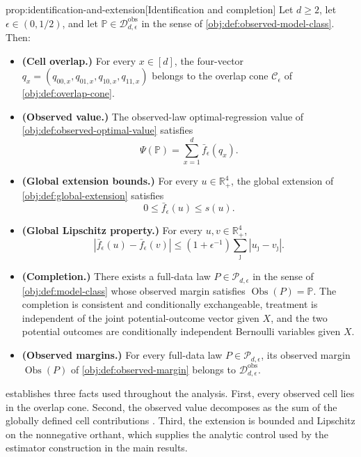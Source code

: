 \documentclass[11pt]{article}
\begin{document}
\begin{propositionv}{prop:identification-and-extension}[Identification and completion]
Let \(d\ge 2\), let \(\epsilon\in(0,1/2)\), and let \(\mathbb P\in\mathcal D_{d,\epsilon}^{\mathrm{obs}}\) in the sense of \cref{obj:def:observed-model-class}. Then:
\begin{itemize}
\item \textbf{(Cell overlap.)} For every \(x\in[d]\), the four-vector \(q_x=(q_{00,x},q_{01,x},q_{10,x},q_{11,x})\) belongs to the overlap cone \(\mathcal C_\epsilon\) of \cref{obj:def:overlap-cone}.
\item \textbf{(Observed value.)} The observed-law optimal-regression value of \cref{obj:def:observed-optimal-value} satisfies
\[
\Psi(\mathbb P)=\sum_{x=1}^d \bar f_\epsilon(q_x).
\]
\item \textbf{(Global extension bounds.)} For every \(u\in\mathbb R_+^4\), the global extension of \cref{obj:def:global-extension} satisfies
\[
0\le \bar f_\epsilon(u)\le s(u).
\]
\item \textbf{(Global Lipschitz property.)} For every \(u,v\in\mathbb R_+^4\),
\[
\left|\bar f_\epsilon(u)-\bar f_\epsilon(v)\right|
\le (1+\epsilon^{-1})\sum_{\jmath}\left|u_{\jmath}-v_{\jmath}\right|.
\]
\item \textbf{(Completion.)} There exists a full-data law \(P\in\mathcal P_{d,\epsilon}\) in the sense of \cref{obj:def:model-class} whose observed margin satisfies \(\operatorname{Obs}(P)=\mathbb P\). The completion is consistent and conditionally exchangeable, treatment is independent of the joint potential-outcome vector given \(X\), and the two potential outcomes are conditionally independent Bernoulli variables given \(X\).
\item \textbf{(Observed margins.)} For every full-data law \(P\in\mathcal P_{d,\epsilon}\), its observed margin \(\operatorname{Obs}(P)\) of \cref{obj:def:observed-margin} belongs to \(\mathcal D_{d,\epsilon}^{\mathrm{obs}}\).
\end{itemize}
\end{propositionv}

 establishes three facts used throughout the analysis. First, every observed cell lies in the overlap cone. Second, the observed value decomposes as the sum of the globally defined cell contributions . Third, the extension is bounded and Lipschitz on the nonnegative orthant, which supplies the analytic control used by the estimator construction in the main results.
\end{document}
